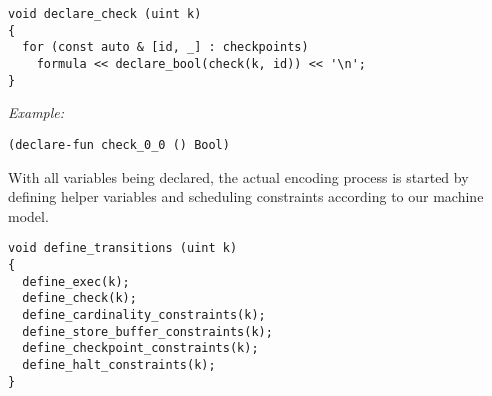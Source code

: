 \begin{lstlisting}[style=c++]
void declare_check (uint k)
{
  for (const auto & [id, _] : checkpoints)
    formula << declare_bool(check(k, id)) << '\n';
}
\end{lstlisting}

\noindent
\emph{Example:} 

\begin{lstlisting}[style=smtlib]
(declare-fun check_0_0 () Bool)
\end{lstlisting}

%
%


\noindent
With all variables being declared, the actual encoding process is started by defining helper variables and scheduling constraints according to our machine model.

\begin{lstlisting}[style=c++]
void define_transitions (uint k)
{
  define_exec(k);
  define_check(k);
  define_cardinality_constraints(k);
  define_store_buffer_constraints(k);
  define_checkpoint_constraints(k);
  define_halt_constraints(k);
}
\end{lstlisting}


